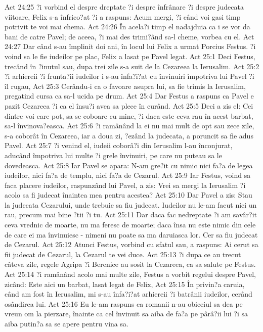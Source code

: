 Act 24:25  ?i vorbind el despre dreptate ?i despre înfrânare ?i despre judecata viitoare, Felix s-a înfrico?at ?i a raspuns: Acum mergi, ?i când voi gasi timp potrivit te voi mai chema.
Act 24:26  În acela?i timp el nadajduia ca i se vor da bani de catre Pavel; de aceea, ?i mai des trimi?ând sa-l cheme, vorbea cu el.
Act 24:27  Dar când s-au împlinit doi ani, în locul lui Felix a urmat Porcius Festus. ?i voind sa le fie iudeilor pe plac, Felix a lasat pe Pavel legat.
Act 25:1  Deci Festus, trecând în ?inutul sau, dupa trei zile s-a suit de la Cezareea la Ierusalim.
Act 25:2  ?i arhiereii ?i frunta?ii iudeilor i s-au înfa?i?at cu învinuiri împotriva lui Pavel ?i îl rugau,
Act 25:3  Cerându-i ca o favoare asupra lui, sa fie trimis la Ierusalim, pregatind cursa ca sa-l ucida pe drum.
Act 25:4  Dar Festus a raspuns ca Pavel e pazit Cezareea ?i ca el însu?i avea sa plece în curând.
Act 25:5  Deci a zis el: Cei dintre voi care pot, sa se coboare cu mine, ?i daca este ceva rau în acest barbat, sa-l învinova?easca.
Act 25:6  ?i ramânând la ei nu mai mult de opt sau zece zile, s-a coborât în Cezareea, iar a doua zi, ?ezând la judecata, a poruncit sa fie adus Pavel.
Act 25:7  ?i venind el, iudeii coborâ?i din Ierusalim l-au înconjurat, aducând împotriva lui multe ?i grele învinuiri, pe care nu puteau sa le dovedeasca.
Act 25:8  Iar Pavel se apara: N-am gre?it cu nimic nici fa?a de legea iudeilor, nici fa?a de templu, nici fa?a de Cezarul.
Act 25:9  Iar Festus, voind sa faca placere iudeilor, raspunzând lui Pavel, a zis: Vrei sa mergi la Ierusalim ?i acolo sa fi judecat înaintea mea pentru acestea?
Act 25:10  Dar Pavel a zis: Stau la judecata Cezarului, unde trebuie sa fiu judecat. Iudeilor nu le-am facut nici un rau, precum mai bine ?tii ?i tu.
Act 25:11  Dar daca fac nedreptate ?i am savâr?it ceva vrednic de moarte, nu ma feresc de moarte; daca însa nu este nimic din cele de care ei ma învinuiesc - nimeni nu poate sa ma daruiasca lor. Cer sa fiu judecat de Cezarul.
Act 25:12  Atunci Festus, vorbind cu sfatul sau, a raspuns: Ai cerut sa fii judecat de Cezarul, la Cezarul te vei duce.
Act 25:13  ?i dupa ce au trecut câteva zile, regele Agripa ?i Berenice au sosit la Cezareea, ca sa salute pe Festus.
Act 25:14  ?i ramânând acolo mai multe zile, Festus a vorbit regelui despre Pavel, zicând: Este aici un barbat, lasat legat de Felix,
Act 25:15  În privin?a caruia, când am fost în Ierusalim, mi s-au înfa?i?at arhiereii ?i batrânii iudeilor, cerând osândirea lui.
Act 25:16  Eu le-am raspuns ca romanii n-au obiceiul sa dea pe vreun om la pierzare, înainte ca cel învinuit sa aiba de fa?a pe pârâ?ii lui ?i sa aiba putin?a sa se apere pentru vina sa.
